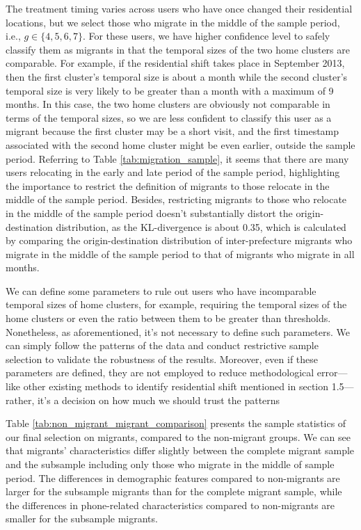 The treatment timing varies across users who have once changed their residential locations, but we select those who migrate in the middle of the sample period, i.e., $g \in \{4,5,6,7\}$. For these users, we have higher confidence level to safely classify them as migrants in that the temporal sizes of the two home clusters are comparable. For example, if the residential shift takes place in September 2013, then the first cluster's temporal size is about a month while the second cluster's temporal size is very likely to be greater than a month with a maximum of 9 months. In this case, the two home clusters are obviously not comparable in terms of the temporal sizes, so we are less confident to classify this user as a migrant because the first cluster may be a short visit, and the first timestamp associated with the second home cluster might be even earlier, outside the sample period. Referring to Table \ref{tab:migration_sample}, it seems that there are many users relocating in the early and late period of the sample period, highlighting the importance to restrict the definition of migrants to those relocate in the middle of the sample period. Besides, restricting migrants to those who relocate in the middle of the sample period doesn't substantially distort the origin-destination distribution, as the KL-divergence is about 0.35, which is calculated by comparing the origin-destination distribution of inter-prefecture migrants who migrate in the middle of the sample period to that of migrants who migrate in all months.

We can define some parameters to rule out users who have incomparable temporal sizes of home clusters, for example, requiring the temporal sizes of the home clusters or even the ratio between them to be greater than thresholds. Nonetheless, as aforementioned, it's not necessary to define such parameters. We can simply follow the patterns of the data and conduct restrictive sample selection to validate the robustness of the results. Moreover, even if these parameters are defined, they are not employed to reduce methodological error—like other existing methods to identify residential shift mentioned in section 1.5—rather, it's a decision on how much we should trust the patterns


Table \ref{tab:non_migrant_migrant_comparison} presents the sample statistics of our final selection on migrants, compared to the non-migrant groups.
We can see that migrants' characteristics differ slightly between the complete migrant sample and the subsample including only those who migrate in the middle of sample period.
The differences in demographic features compared to non-migrants are larger for the subsample migrants than for the complete migrant sample, while the differences in phone-related characteristics compared to non-migrants are smaller for the subsample migrants.


